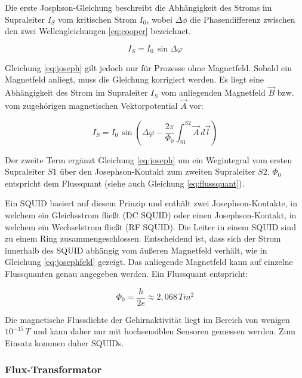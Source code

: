 \documentclass[doc,a4paper,12pt]{apa6}
\begin{document}
Die erste Josphson-Gleichung beschreibt die Abhängigkeit des Stroms im Supraleiter $I_S$ vom kritischen Strom $I_0$, wobei $\Delta \phi$ die Phasendifferenz zwischen den zwei Wellengleichungen \ref{eq:cooper} bezeichnet.

\begin{equation}
\label{eq:joseph}
I_S = I_0\,\sin{\Delta \varphi}
\end{equation}

Gleichung \ref{eq:joseph} gilt jedoch nur für Prozesse ohne Magnetfeld. Sobald ein Magnetfeld anliegt, muss die Gleichung korrigiert werden. Es liegt eine Abhängigkeit des Strom im Supraleiter $I_S$ vom anliegenden Magnetfeld $\vec{B}$ bzw. vom zugehörigen magnetischen Vektorpotential $\vec{A}$ vor:

\begin{equation}
\label{eq:josephfeld}
I_S = I_0\,\sin{\left( \Delta \varphi - \frac{2\pi}{\Phi_0} \int_{S1}^{S2} \vec{A}\,d\vec{l} \right)}
\end{equation}

Der zweite Term ergänzt Gleichung \ref{eq:joseph} um ein Wegintegral vom ersten Supraleiter $S1$ über den Josephson-Kontakt zum zweiten Supraleiter $S2$. $\Phi_0$ entspricht dem Flussquant (siehe auch Gleichung \ref{eq:flussquant}).

Ein SQUID basiert auf diesem Prinzip und enthält zwei Josephson-Kontakte, in welchem ein Gleichsstrom fließt (DC SQUID) oder einen Josephson-Kontakt, in welchem ein Wechselstrom fließt (RF SQUID). Die Leiter in einem SQUID sind zu einem Ring zusammengeschlossen. Entscheidend ist, dass sich der Strom innerhalb des SQUID abhängig vom äußeren Magnetfeld verhält, wie in Gleichung \ref{eq:josephfeld} gezeigt. Das anliegende Magnetfeld kann auf einzelne Flussquanten genau angegeben werden. Ein Flussquant entspricht:

\begin{equation}
\label{eq:flussquant}
\Phi_0 = \frac{h}{2e} \approx 2,068\,Tm^2
\end{equation}

Die magnetische Flussdichte der Gehirnaktivität liegt im Bereich von wenigen $10^{-15}\,T$ und kann daher nur mit hochsensiblen Sensoren gemessen werden. Zum Einsatz kommen daher SQUIDs.

\subsubsection{Flux-Transformator}
\end{document}
